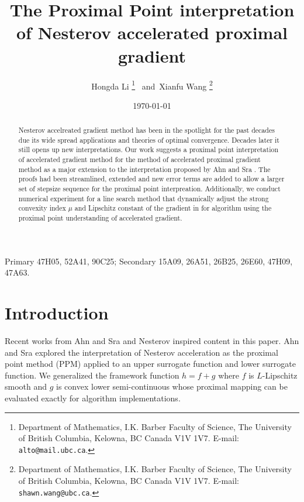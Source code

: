 \documentclass[12pt]{article}
\begin{document}
\title{{\selectfont The Proximal Point interpretation of Nesterov accelerated proximal gradient}}

\author{
    Hongda Li
    \thanks{Department of Mathematics, I.K. Barber Faculty of Science,
    The University of British Columbia, Kelowna, BC Canada V1V 1V7. E-mail:  \texttt{alto@mail.ubc.ca}.}~ and~Xianfu Wang
    \thanks{Department of Mathematics, I.K. Barber Faculty of Science,
    The University of British Columbia, Kelowna, BC Canada V1V 1V7. E-mail:  \texttt{shawn.wang@ubc.ca}.}
}

\date{\today}

\maketitle


\begin{abstract} 
    \noindent
    Nesterov accelreated gradient method has been in the spotlight for the past decades due its wide spread applications and theories of optimal convergence. 
    Decades later it still opens up new interpretations. 
    Our work suggests a proximal point interpretation of accelerated gradient method for the method of accelerated proximal gradient method as a major extension to the interpretation proposed by Ahn and Sra \cite{ahn_understanding_2022}. 
    The proofs had been streamlined, extended and new error terms are added to allow a larger set of stepsize sequence for the proximal point interpreation. 
    Additionally, we conduct numerical experiment for a line search method that dynamically adjust the strong convexity index $\mu$ and Lipschitz constant of the gradient in for algorithm  using the proximal point understanding of accelerated gradient. 
    
\end{abstract}

Primary 47H05, 52A41, 90C25; Secondary 15A09, 26A51, 26B25, 26E60, 47H09, 47A63.

\section{Introduction}
    
    Recent works from Ahn and Sra \cite{ahn_understanding_2022} and Nesterov \cite{nesterov_lectures_2018} inspired content in this paper.
    Ahn and Sra explored the interpretation of Nesterov acceleration as the proximal point method (PPM) applied to an upper surrogate function and lower surrogate function. 
    We generalized the framework function $h = f + g$ where $f$ is $L$-Lipschitz smooth and $g$ is convex lower semi-continuous whose proximal mapping can be evaluated exactly for algorithm implementations. 
    
\end{document}
